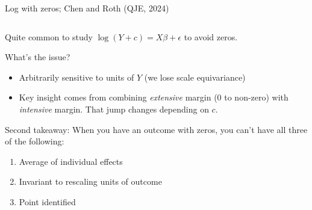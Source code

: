 \documentclass[notes,11pt, aspectratio=169]{beamer}
\newenvironment{wideitemize}{\itemize\addtolength{\itemsep}{10pt}}{\enditemize}
\begin{document}
  \begin{frame}{Log with zeros; Chen and Roth (QJE, 2024)}
    \begin{columns}[T] %
      \begin{column}{.6\textwidth}
    \begin{wideitemize}
      \item Quite common to study $\log(Y + c) = X\beta + \epsilon$ to avoid zeros. 
      \item What's the issue?
\begin{itemize}
  \item Arbitrarily sensitive to units of $Y$ (we lose scale equivariance)
  \item Key insight comes from combining \emph{extensive} margin (0 to non-zero) with \emph{intensive} margin. That jump changes depending on $c$.
\end{itemize}
\item Second takeaway: When you have an outcome with zeros, you can't have all three of the following:
  \begin{enumerate}
    \item Average of individual effects
    \item Invariant to rescaling units of outcome
    \item Point identified
  \end{enumerate}
    \end{wideitemize}
  

\end{column}
\end{columns}
\end{frame}
\end{document}
